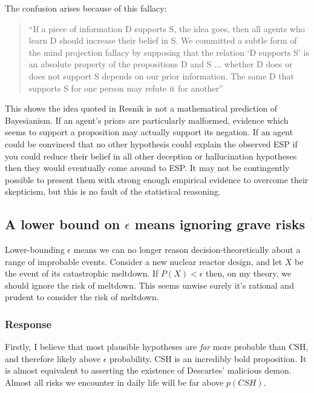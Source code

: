 \documentclass{article}
\begin{document}
The confusion arises because of this fallacy: 

\begin{quote}
``If a piece of information D supports S, the idea goes, then all agents who learn D should increase their belief in S. We committed a subtle form of the mind projection fallacy by supposing that the relation ‘D supports S’ is an absolute property of the propositions D and S ... whether D does or does not support S depends on our prior information. The same D that supports S for one person may refute it for another'' \citep[pg. 131]{jaynes2003probability}
\end{quote}

This shows the idea quoted in Resnik is not a mathematical prediction of Bayesianism. If an agent's priors are particularly malformed, evidence which seems to support a proposition may actually support its negation. If an agent could be convinced that no other hypothesis could explain the observed ESP \textemdash{} if you could reduce their belief in all other deception or hallucination hypotheses \textemdash{} then they would eventually come around to ESP. It may not be contingently possible to present them with strong enough empirical evidence to overcome their skepticism, but this is no fault of the statistical reasoning.

\subsection{A lower bound on \(\epsilon\) means ignoring grave risks}
Lower-bounding \(\epsilon\) means we can no longer reason decision-theoretically about a range of improbable events. Consider a new nuclear reactor design, and let \(X\) be the event of its catastrophic meltdown. If \(P(X) < \epsilon\) then, on my theory, we should ignore the risk of meltdown. This seems unwise \textemdash{} surely it's rational and prudent to consider the risk of meltdown.

\subsubsection*{Response}

Firstly, I believe that most plausible hypotheses are \textit{far} more probable than CSH, and therefore likely above \(\epsilon\) probability. CSH is an incredibly bold proposition. It is almost equivalent to asserting the existence of Descartes' malicious demon. Almost all risks we encounter in daily life will be far above \(p(CSH)\). 
\end{document}
